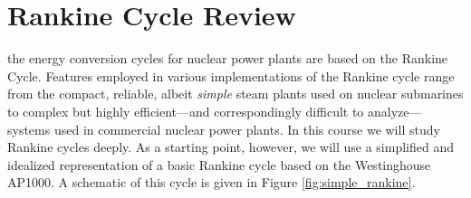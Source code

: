 \documentclass{tufte-book}
\begin{document}
%
%
\section{Rankine Cycle Review}
 the energy conversion cycles for nuclear power plants are based on the Rankine Cycle.   Features employed in various implementations of the Rankine cycle range from the compact, reliable, albeit \emph{simple} steam plants used on nuclear submarines to complex but highly efficient---and correspondingly difficult to analyze---systems used in commercial nuclear power plants.  In this course we will study Rankine cycles deeply.  As a starting point, however, we will use a simplified and idealized representation of a basic Rankine cycle based on the Westinghouse AP1000. \cite{westinghouse2011westinghouse}  A schematic of this cycle is given in Figure \ref{fig:simple_rankine}.
\end{document}
